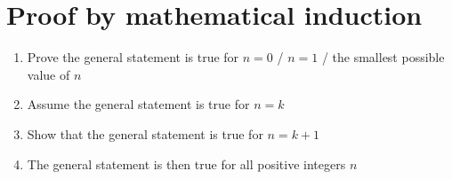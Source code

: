 \section{Proof by mathematical induction}
\begin{enumerate}
	\item Prove the general statement is true for $n=0$ / $n=1$ / the smallest possible value of $n$
	\item Assume the general statement is true for $n=k$
	\item Show that the general statement is true for $n=k+1$
	\item The general statement is then true for all positive integers $n$
\end{enumerate}